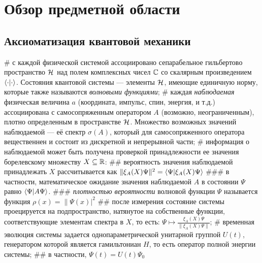 \chapter{Обзор предметной области}
\label{chapter1}



\section{Аксиоматизация квантовой механики}

\begin{easylist}[itemize]
# с каждой физической системой ассоциировано сепарабельное гильбертово пространство $\mathcal{H}_{}$ над полем комплексных чисел $\mathbb{C}$ со скалярным произведением $\ipcdot$. Состояния квантовой системы — элементы $\mathcal{H}_{}$, имеющие единичную норму, которые также называются \textit{волновыми функциями};
# каждая \textit{наблюдаемая} физическая величина $a$ (координата, импульс, спин, энергия, и т.д.) ассоциирована с самосопряженным оператором $A$ (возможно, неограниченным), плотно определенным в пространстве $\mathcal{H}_{}$. Множество возможных значений наблюдаемой — её спектр $\sigma(A)$, который для самосопряженного оператора вещественнен и состоит из дискретной и непрерывной части;
# информация о наблюдаемой может быть получена проверкой принадлежности ее значения борелевскому множеству $X \subseteq \mathbb{R}$:
## вероятность значения наблюдаемой принадлежать $X$ рассчитывается как $\| \xi_A(X) \Psi \|^2 = \ip{\Psi}{\xi_A(X) \Psi}$
### в частности, математическое ожидание значения наблюдаемой $A$ в состоянии $\Psi$ равно $\ip{\Psi}{A \Psi}$.
### \textit{плотностью вероятности} волновой функции $\Psi$ называется функция $\rho(x) = \|\Psi(x)|^2$
## после измерения состояние системы проецируется на подпространство, натянутое на собственные функции, соответствующие элементам спектра в $X$, то есть: $\Psi \mapsto \frac{\xi_A(X) \Psi}{\| \xi_A(X) \Psi \|}$;
# временная эволюция системы задается однопараметрической унитарной группой $U(t)$, генератором которой является гамильтониан $H$, то есть оператор полной энергии системы;
## в частности, $\Psi(t) = U(t) \Psi_0$
\end{easylist}

